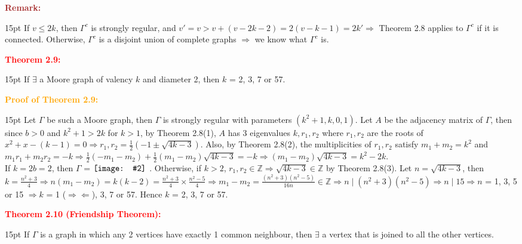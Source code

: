 \documentclass[12pt]{article}
\newcommand{\noparskip}{\vspace{-\parskip}}
\newenvironment{dent}
	{\begin{adjustwidth}{15pt}{}\noparskip}
	{\end{adjustwidth}}
\newenvironment{result}[1]
	{\textcolor{Red}{\textbf{#1:}}\begin{dent}}
	{\end{dent}}
\newenvironment{proof}[1]
	{\textcolor{Orange}{\textbf{Proof of #1:}}\begin{dent}}
	{\end{dent}}
\newenvironment{remark}
	{\textcolor{Brown}{\textbf{Remark:}}\begin{dent}}
	{\end{dent}}
\newcommand{\pic}[2][1.0]{
	$\vcenter{\hbox{\texttt{[image: \#2]}\ }}$}
\renewcommand{\implies}{\Rightarrow}
\newcommand{\contradiction}{\Rightarrow \Leftarrow}
\newcommand{\Z}{\mathbb{Z}}
\begin{document}
\begin{remark}
If $v \le 2k$, then $\Gamma^c$ is strongly regular, and $v' = v > v + (v - 2k - 2) = 2(v - k - 1) = 2k' \implies$ Theorem 2.8 applies to $\Gamma^c$ if it is connected. Otherwise, $\Gamma^c$ is a disjoint union of complete graphs $\implies$ we know what $\Gamma^c$ is.
\end{remark}

\begin{result}{Theorem 2.9}
If $\exists$ a Moore graph of valency $k$ and diameter 2, then $k$ = 2, 3, 7 or 57.
\end{result}

\begin{proof}{Theorem 2.9}
Let $\Gamma$ be such a Moore graph, then $\Gamma$ is strongly regular with parameters $(k^2 + 1, k, 0, 1)$. Let $A$ be the adjacency matrix of $\Gamma$, then since $b > 0$ and $k^2 + 1 > 2k$ for $k > 1$, by Theorem 2.8(1), $A$ has 3 eigenvalues $k, r_1, r_2$ where $r_1, r_2$ are the roots of $x^2 + x - (k - 1) = 0 \implies r_1, r_2 = \frac{1}{2} (-1 \pm \sqrt{4k - 3})$. Also, by Theorem 2.8(2), the multiplicities of $r_1, r_2$ satisfy $m_1 + m_2 = k^2$ and $m_1 r_1 + m_2 r_2 = -k \implies \frac{1}{2} (-m_1 - m_2) + \frac{1}{2} (m_1 - m_2) \sqrt{4k - 3} = -k \implies (m_1 - m_2) \sqrt{4k - 3} = k^2 - 2k$. \\
If $k = 2b = 2$, then $\Gamma$ = \pic[0.15]{8.png}. Otherwise, if $k > 2$, $r_1, r_2 \in \Z \implies \sqrt{4k - 3} \in \Z$ by Theorem 2.8(3). Let $n = \sqrt{4k - 3}$, then $k = \frac{n^2 + 3}{4} \implies n(m_1 - m_2) = k(k - 2) = \frac{n^2 + 3}{4} \times \frac{n^2 - 5}{4} \implies m_1 - m_2 = \frac{(n^2 + 3)(n^2 - 5)}{16n} \in \Z \implies n \mid (n^2 + 3)(n^2 - 5) \implies n \mid 15 \implies n$ = 1, 3, 5 or 15 $\implies k$ = 1 ($\contradiction$), 3, 7 or 57. Hence $k$ = 2, 3, 7 or 57.
\end{proof}

\begin{result}{Theorem 2.10 (Friendship Theorem)}
If $\Gamma$ is a graph in which any 2 vertices have exactly 1 common neighbour, then $\exists$ a vertex that is joined to all the other vertices.
\end{result}
\end{document}
